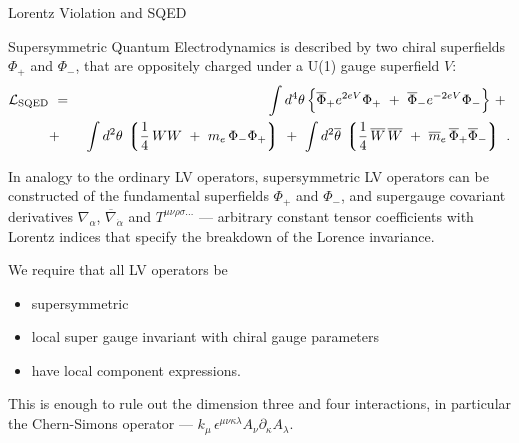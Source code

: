 \documentclass[pdf,PItalk,slideColor,colorBG,accumulate]{prosper}
\newcommand{\myit}{\usefont{T1}{ppl}{m}{it}\fontsize{8pt}{6pt}\selectfont}
\begin{document}
{
\begin{slide}{\small Lorentz Violation and SQED}
{
}

	Supersymmetric Quantum Electrodynamics is described by two
	chiral superfields 
	{\blue $ \Phi_+ $} and 
	{\blue $ \Phi_- $}, that are
	oppositely charged under a U(1) gauge superfield 
	{\blue $ V $}:
\begin{eqnarray*}
\mathcal{L}_{\rm SQED} & ~=~
&
\int d^4\theta\, \Big\{ 
   \overline{\Phi}_+ e^{2eV} \Phi_+ ~+~
   \overline{\Phi}_- e^{-2eV} {\Phi}_-  \Big\} ~+~ \\
& + &
\int d^2\theta\, \left\lgroup \frac{1}{4}\,  WW ~+~m_e\, \Phi_-\Phi_+ 
	\right\rgroup ~+~
\int d^2\overline{\theta}\, 
\left\lgroup \frac{1}{4}\, \overline{W}\,\overline{W} ~+~ 
\overline{m}_e\, \overline{\Phi}_+\overline{\Phi}_- 
\right\rgroup~. 
\nonumber 
\end{eqnarray*}
%

	In analogy to the ordinary LV operators, supersymmetric 
	LV operators can be constructed of the 
	fundamental
	{\blue super}fields {\blue $ \Phi_+ $} and 
	{\blue $ \Phi_- $}, 
	and {\blue super}gauge covariant
	derivatives 
	{\blue $ \nabla_\alpha $, $ \overline{\nabla}_{\dot\alpha} $}
	and {\blue $ T^{\mu\nu\rho\sigma\dots} $} ---
	{\myit arbitrary} constant tensor coefficients with
	Lorentz indices that specify the breakdown of the Lorence
	invariance.

	We require that all LV operators be
\begin{itemize}
\item supersymmetric 
\item local super gauge invariant with chiral gauge parameters
\item have local component expressions. 
\end{itemize}

	This is enough to rule out the dimension three and four 
	interactions, in particular the {\myit
	Chern-Simons operator} --- 
	{\blue
	$ k_\mu\,  
\epsilon^{\mu\nu\kappa\lambda} A_\nu \partial_\kappa A_\lambda $}.

\end{slide}
}

\end{document}
